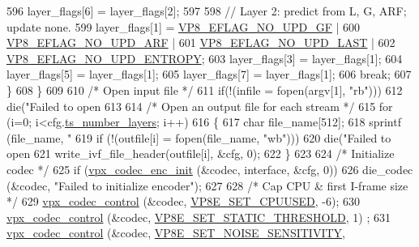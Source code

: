 \begin{DoxyCodeInclude}
{{{{{{{{{{{{{{{596        layer\_flags[6] = layer\_flags[2];
597 
598        \textcolor{comment}{// Layer 2: predict from L, G, ARF; update none.}
599        layer\_flags[1] = \hyperlink{group__vp8__encoder_gab01d066c5236457d345ce1cab4c41d6b}{VP8\_EFLAG\_NO\_UPD\_GF} |
600                         \hyperlink{group__vp8__encoder_ga1cff46a5287e73a620660030d40b9e6c}{VP8\_EFLAG\_NO\_UPD\_ARF} |
601                         \hyperlink{group__vp8__encoder_ga602edb6b02a89cb2db7a16d6dffba583}{VP8\_EFLAG\_NO\_UPD\_LAST} |
602                         \hyperlink{group__vp8__encoder_ga5b91ad179910d4efc23aef66c7b2148b}{VP8\_EFLAG\_NO\_UPD\_ENTROPY};
603        layer\_flags[3] = layer\_flags[1];
604        layer\_flags[5] = layer\_flags[1];
605        layer\_flags[7] = layer\_flags[1];
606        \textcolor{keywordflow}{break};
607     \}
608     \}
609 
610     \textcolor{comment}{/* Open input file */}
611     \textcolor{keywordflow}{if}(!(infile = fopen(argv[1], \textcolor{stringliteral}{"rb"})))
612         die(\textcolor{stringliteral}{"Failed to open %
613 
614     \textcolor{comment}{/* Open an output file for each stream */}
615     \textcolor{keywordflow}{for} (i=0; i<cfg.\hyperlink{structvpx__codec__enc__cfg_a16d4549a30cbd585e3c3056ef873d8c7}{ts\_number\_layers}; i++)
616     \{
617         \textcolor{keywordtype}{char} file\_name[512];
618         sprintf (file\_name, \textcolor{stringliteral}{"%
619         \textcolor{keywordflow}{if} (!(outfile[i] = fopen(file\_name, \textcolor{stringliteral}{"wb"})))
620             die(\textcolor{stringliteral}{"Failed to open %
621         write\_ivf\_file\_header(outfile[i], &cfg, 0);
622     \}
623 
624     \textcolor{comment}{/* Initialize codec */}
625     \textcolor{keywordflow}{if} (\hyperlink{group__encoder_ga3d490a2a9a6acd7c9ef82a603155f3cf}{vpx\_codec\_enc\_init} (&codec, interface, &cfg, 0))
626         die\_codec (&codec, \textcolor{stringliteral}{"Failed to initialize encoder"});
627 
628     \textcolor{comment}{/* Cap CPU & first I-frame size */}
629     \hyperlink{group__codec_gac1b91e04698c1bd4c0a2b8aa85b08cd2}{vpx\_codec\_control} (&codec, \hyperlink{group__vp8__encoder_gga6deae3d561c838952552c3d3756322eca953ff0eaa2fcdc2ecd627e449b026853}{VP8E\_SET\_CPUUSED},                -6);
630     \hyperlink{group__codec_gac1b91e04698c1bd4c0a2b8aa85b08cd2}{vpx\_codec\_control} (&codec, \hyperlink{group__vp8__encoder_gga6deae3d561c838952552c3d3756322ecab34559df04d3d662616300ed0682dcfd}{VP8E\_SET\_STATIC\_THRESHOLD},      1)
      ;
631     \hyperlink{group__codec_gac1b91e04698c1bd4c0a2b8aa85b08cd2}{vpx\_codec\_control} (&codec, \hyperlink{group__vp8__encoder_gga6deae3d561c838952552c3d3756322eca3fa90cb70bade72af3c2d8d91471a36c}{VP8E\_SET\_NOISE\_SENSITIVITY},      
}}}}}}}}}}}}}}}}}}
\end{DoxyCodeInclude}

